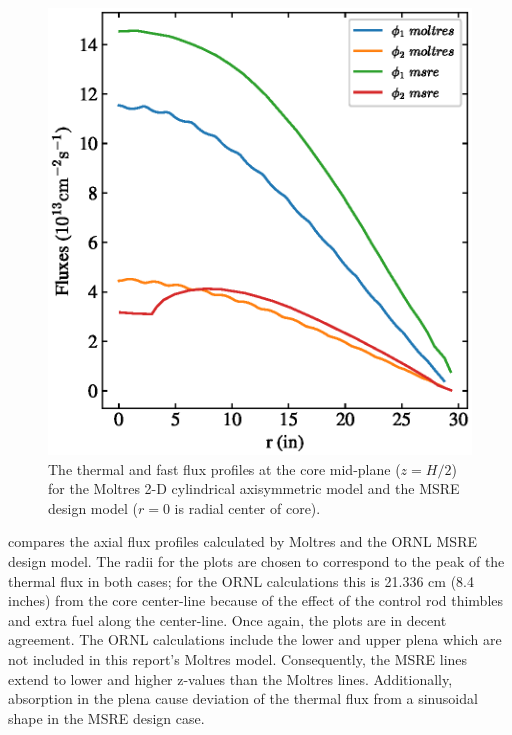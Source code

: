 \documentclass{article}
\makeatletter
\def\maxwidth#1{\ifdim\Gin@nat@width>#1 #1\else\Gin@nat@width\fi}
\makeatother
\begin{document}
\begin{figure}[htpb]
    \centering
      \includegraphics[width=\maxwidth{\textwidth}]{combined_msre_moltres_radial.eps}
      \caption{The thermal and fast flux profiles at the core mid-plane
        ($z=H/2$) for the Moltres 2-D cylindrical axisymmetric model and the
        \gls{MSRE} design model \cite[p. 92]{briggs_molten-salt_1964} ($r=0$ is
        radial center of core).}
    \label{fig:radial_fluxes_compare}
\end{figure}

 compares the axial flux profiles calculated by
Moltres and the \gls{ORNL} \gls{MSRE} design model. The radii for the plots are
chosen to correspond to the peak of the thermal flux in both cases; for the
\gls{ORNL} calculations this is 21.336 cm (8.4 inches) from the core center-line because of
the effect of the control rod thimbles and extra fuel along the
center-line. Once again, the plots are in decent agreement. The \gls{ORNL}
calculations include the lower and upper plena which are not included in this
report's Moltres model. Consequently, the \gls{MSRE} lines extend to lower and
higher z-values than the Moltres lines. Additionally, absorption
in the plena cause deviation of the thermal flux from a sinusoidal shape in the
\gls{MSRE} design case.
\end{document}
